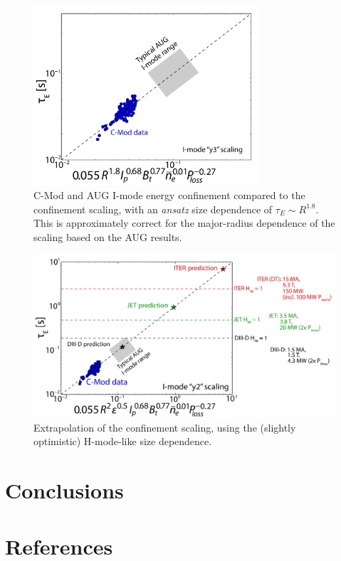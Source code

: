 \documentclass[12pt]{iopart}
\begin{document}
\begin{figure}[ht]
 \centering
 \includegraphics[width=0.75\textwidth]{tauE_Imode_free_R.pdf}
 \caption{C-Mod and AUG I-mode energy confinement compared to the confinement scaling, with an \emph{ansatz} size dependence of $\tau_E \sim R^{1.8}$.  This is approximately correct for the major-radius dependence of the scaling based on the AUG results.}
 \label{fig:freeR}
\end{figure}

\begin{figure}[ht]
 \centering
 \includegraphics[width=\textwidth]{tauE_Imode_fixed-H-like_project_detail.pdf}
 \caption{Extrapolation of the confinement scaling, using the (slightly optimistic) H-mode-like size dependence.}
 \label{fig:extrap}
\end{figure}

\section{Conclusions}\label{sec:conclusion}

\section*{References}


\end{document}
